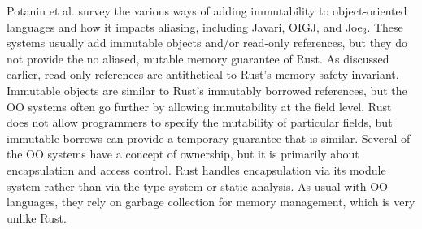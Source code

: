 Potanin et al. \cite{ooimmutability} survey the various ways of adding immutability
to object-oriented languages and how it impacts aliasing, including Javari, OIGJ, and Joe$_3$.
These systems usually add immutable objects and/or read-only references, but they do not
provide the no aliased, mutable memory guarantee of Rust. As discussed earlier, read-only
references are antithetical to Rust's memory safety invariant. Immutable objects are similar
to Rust's immutably borrowed references, but the OO systems often go further by allowing
immutability at the field level. Rust does not allow programmers to specify the
mutability of particular fields, but immutable borrows can provide a temporary guarantee
that is similar. Several of the OO systems have a concept of ownership, but it is primarily
about encapsulation and access control. 
Rust handles encapsulation via its module system rather than
via the type system or static analysis. As usual with OO languages, they rely on garbage
collection for memory management, which is very unlike Rust.
